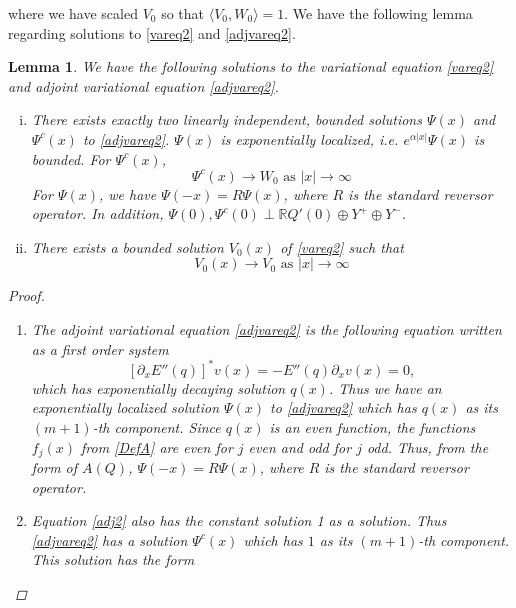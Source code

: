 \documentclass[12pt]{article}
\def\R{{\mathbb R}}
\newtheorem{lemma}{Lemma}
\begin{document}
where we have scaled $V_0$ so that $\langle V_0, W_0 \rangle = 1$. We have the following lemma regarding solutions to \eqref{vareq2} and \eqref{adjvareq2}.

\begin{lemma}\label{varadjsolutions}
We have the following solutions to the variational equation \eqref{vareq2} and adjoint variational equation \eqref{adjvareq2}.

\begin{enumerate}[(i)]

\item There exists exactly two linearly independent, bounded solutions $\Psi(x)$ and $\Psi^c(x)$ to \eqref{adjvareq2}. $\Psi(x)$ is exponentially localized, i.e. $e^{\alpha |x|}\Psi(x)$ is bounded. For $\Psi^c(x)$,
	\begin{equation}
	\Psi^c(x) \rightarrow W_0 \text{ as }|x| \rightarrow \infty
	\end{equation}
For $\Psi(x)$, we have $\Psi(-x) = R \Psi(x)$, where $R$ is the standard reversor operator. In addition, $\Psi(0), \Psi^c(0) \perp \R Q'(0) \oplus Y^+ \oplus Y^-$.

\item There exists a bounded solution $V_0(x)$ of \eqref{vareq2} such that 
\begin{equation}
V_0(x) \rightarrow V_0 \text{ as }|x| \rightarrow \infty
\end{equation}
\end{enumerate}

\begin{proof}

\begin{enumerate}
\item The adjoint variational equation \eqref{adjvareq2} is the following equation written as a first order system
\begin{equation}\label{adj2}
[\partial_x E''(q) ]^* v(x) = -E''(q) \partial_x v(x) = 0,
\end{equation}
which has exponentially decaying solution $q(x)$. Thus we have an exponentially localized solution $\Psi(x)$ to \eqref{adjvareq2} which has $q(x)$ as its $(m+1)$-th component. Since $q(x)$ is an even function, the functions $f_j(x)$ from \eqref{DefA} are even for $j$ even and odd for $j$ odd. Thus, from the form of $A(Q)$, $\Psi(-x) = R \Psi(x)$, where $R$ is the standard reversor operator.

\item Equation \eqref{adj2} also has the constant solution 1 as a solution. Thus \eqref{adjvareq2} has a solution $\Psi^c(x)$ which has $1$ as its $(m+1)$-th component. This solution has the form


\end{enumerate}
\end{proof}
\end{lemma}
\end{document}
